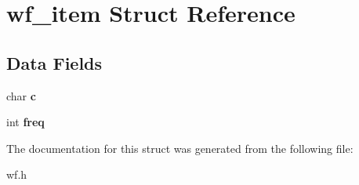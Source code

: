 \hypertarget{structwf__item}{}\section{wf\+\_\+item Struct Reference}
\label{structwf__item}
\subsection*{Data Fields}
\begin{DoxyCompactItemize}
\item 
\hypertarget{structwf__item_a5f3c509f1de8235666c0a97c1cdc2c7a}{}char {\bfseries c}\label{structwf__item_a5f3c509f1de8235666c0a97c1cdc2c7a}

\item 
\hypertarget{structwf__item_a9fefb7ff4646ce798279d560d1c9d4d2}{}int {\bfseries freq}\label{structwf__item_a9fefb7ff4646ce798279d560d1c9d4d2}

\end{DoxyCompactItemize}


The documentation for this struct was generated from the following file\+:\begin{DoxyCompactItemize}
\item 
wf.\+h\end{DoxyCompactItemize}
